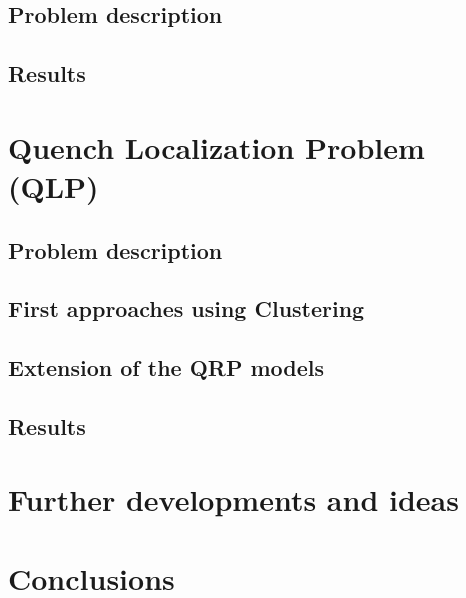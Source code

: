 \documentclass[a4paper]{book}
\begin{document}
\section{Problem description}
\section{Results}
\chapter{Quench Localization Problem (QLP)}
\section{Problem description}
\section{First approaches using Clustering}
\section{Extension of the QRP models}
\section{Results}
\chapter{Further developments and ideas}
\chapter{Conclusions}

\printbibliography

%
%
%
%
%
%
%
%
%
%
%
%
%
%
%
\end{document}
